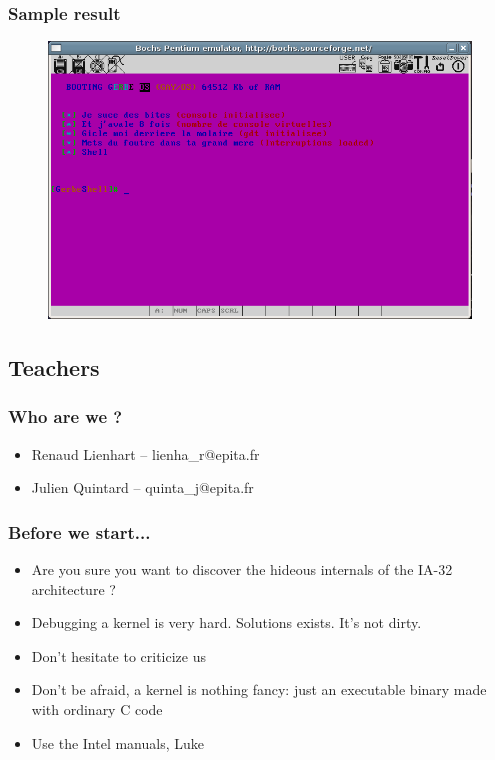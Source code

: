 \documentclass{beamer}
\begin{document}
\begin{frame}
  \frametitle{Sample result}

  \begin{figure}
  \includegraphics[scale=0.4]{gerbeos.png}
  \end{figure}
\end{frame}


\subsection{Teachers}

\begin{frame}
  \frametitle{Who are we ?}

  \begin{itemize}
  \item
    Renaud Lienhart -- lienha\_r@epita.fr
  \item
    Julien Quintard -- quinta\_j@epita.fr
  \end{itemize}
\end{frame}

\begin{frame}
  \frametitle{Before we start...}

  \begin{itemize}
  \item
    Are you sure you want to discover the hideous internals of the IA-32 architecture ?
  \item
    Debugging a kernel is very hard. Solutions exists. It's not dirty.
  \item
    Don't hesitate to criticize us
  \end{itemize}
  \begin{itemize}
  \item
    Don't be afraid, a kernel is nothing fancy: just an executable binary made with ordinary C code
  \item
    Use the Intel manuals, Luke
  \end{itemize}
\end{frame}
\end{document}
